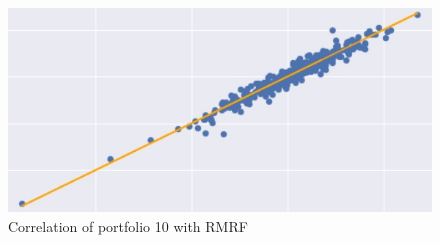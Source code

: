 \documentclass[11pt]{article}
\begin{document}
\begin{figure}[H]
    \begin{center}
        \includegraphics[scale = .7]{p10.jpg}
    \end{center}
    \caption{Correlation of portfolio 10 with RMRF}
    \label{fig:p10}
\end{figure}
\end{document}
